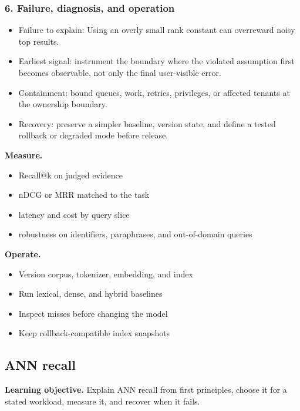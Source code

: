 \subsubsection*{6. Failure, diagnosis, and operation}
\begin{itemize}
\item Failure to explain: Using an overly small rank constant can overreward noisy top results.
\item Earliest signal: instrument the boundary where the violated assumption first becomes observable, not only the final user-visible error.
\item Containment: bound queues, work, retries, privileges, or affected tenants at the ownership boundary.
\item Recovery: preserve a simpler baseline, version state, and define a tested rollback or degraded mode before release.
\end{itemize}
\textbf{Measure.}\begin{itemize}
\item Recall@k on judged evidence
\item nDCG or MRR matched to the task
\item latency and cost by query slice
\item robustness on identifiers, paraphrases, and out-of-domain queries
\end{itemize}
\textbf{Operate.}\begin{itemize}
\item Version corpus, tokenizer, embedding, and index
\item Run lexical, dense, and hybrid baselines
\item Inspect misses before changing the model
\item Keep rollback-compatible index snapshots
\end{itemize}
\subsection{ANN recall}
\textbf{Learning objective.} Explain ANN recall from first principles, choose it for a stated workload, measure it, and recover when it fails.
